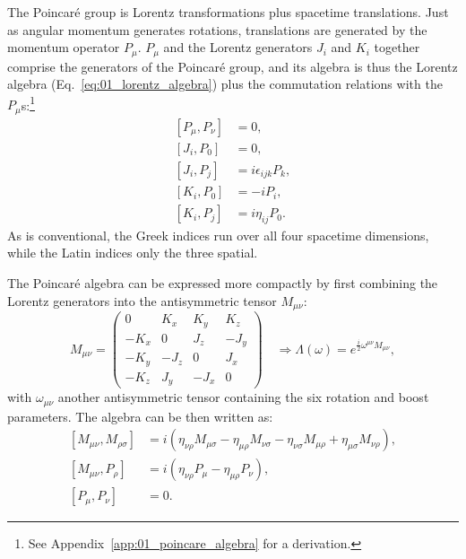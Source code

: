The Poincaré group is Lorentz transformations plus spacetime translations.
Just as angular momentum generates rotations, translations are generated by the momentum operator $P_\mu$.
$P_\mu$ and the Lorentz generators $J_i$ and $K_i$ together comprise the generators of the Poincaré group, and its algebra is thus the Lorentz algebra (Eq.~\ref{eq:01_lorentz_algebra}) plus the commutation relations with the $P_\mu$s:\footnote{See Appendix~\ref{app:01_poincare_algebra} for a derivation.}
\begin{equation}
	\label{eq:01_poincare_algebra}
	\begin{split}
		[P_\mu, P_\nu] &= 0, \\
		[J_i, P_0] &= 0, \\
		[J_i, P_j] &= i \epsilon_{ijk}P_k, \\
		[K_i, P_0] &= -i P_i, \\
		[K_i, P_j] &= i \eta_{ij}P_0.
	\end{split}
\end{equation}
As is conventional, the Greek indices run over all four spacetime dimensions, while the Latin indices only the three spatial.

The Poincaré algebra can be expressed more compactly by first combining the Lorentz generators into the antisymmetric tensor $M_{\mu\nu}$:
\begin{equation}
\label{eq:01_lorentz_generators_mmunu}
M_{\mu\nu} = \begin{pmatrix}
	0 & K_x & K_y & K_z \\
	-K_x & 0 & J_z & -J_y \\
	-K_y & -J_z & 0 & J_x \\
	-K_z & J_y & -J_x & 0
\end{pmatrix}
\quad\Rightarrow \Lambda(\omega) = e^{\frac{i}{2}\omega^{\mu\nu} M_{\mu\nu}},
\end{equation}
with $\omega_{\mu\nu}$ another antisymmetric tensor containing the six rotation and boost parameters.
The algebra can be then written as:
\begin{equation}
	\begin{split}
		\label{eq:01_poincare_algebra_mmunu}
		[M_{\mu\nu}, M_{\rho\sigma}] &= i(\eta_{\nu\rho}M_{\mu\sigma} - \eta_{\mu\rho}M_{\nu\sigma} - \eta_{\nu\sigma}M_{\mu\rho} + \eta_{\mu\sigma}M_{\nu\rho}), \\
		[M_{\mu\nu}, P_\rho] &= i(\eta_{\nu\rho}P_\mu - \eta_{\mu\rho}P_\nu), \\
		[P_\mu, P_\nu] &= 0.
	\end{split}
\end{equation}

